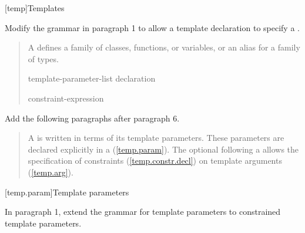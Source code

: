 
\setcounter{chapter}{16}
[temp]{Templates}

Modify the  grammar in paragraph 1 to 
allow a template declaration to specify a .

\begin{quote}
\pnum
A  defines a family of classes, functions, or variables, or an alias for a
family of types.

\begin{bnf}
\br
   \terminal{<} template-parameter-list \terminal{>}
     declaration

\begin{addedblock}
\br
   constraint-expression
\end{addedblock}
\end{bnf}

\end{quote}
  
Add the following paragraphs after paragraph 6.

\begin{quote}
\begin{addedblock}
\setcounter{Paras}{6}
\pnum
A  is written in terms of its template 
parameters. These parameters are declared explicitly in a 
 (\ref{temp.param}).
%
The optional  following a
 allows the specification of
constraints (\ref{temp.constr.decl}) on template arguments (\ref{temp.arg}).
\end{addedblock}
\end{quote}


[temp.param]{Template parameters}

In paragraph 1, extend the grammar for template parameters to 
constrained template parameters.

